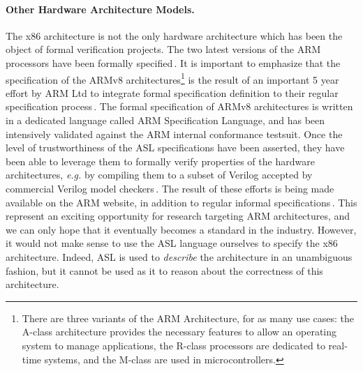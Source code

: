\paragraph{Other Hardware Architecture Models.}
%
The x86 architecture is not the only hardware architecture which has been the
object of formal verification projects.
%
The two latest versions of the ARM processors have been formally
specified\,\cite{fox2010armv7,reid2016armv8}.
%
It is important to emphasize that the specification of the ARMv8
architectures\footnote{There are three variants of the ARM Architecture, for as
  many use cases: the A-class architecture provides the necessary features to
  allow an operating system to manage applications, the R-class processors are
  dedicated to real-time systems, and the M-class are used in microcontrollers.}
is the result of an important 5 year effort by ARM Ltd to integrate formal
specification definition to their regular specification
process\,\cite{reid2016armv8}.
%
The formal specification of ARMv8 architectures is written in a dedicated
language called ARM Specification Language, and has been intensively validated
against the ARM internal conformance testsuit.
%
Once the level of trustworthiness of the ASL specifications have been asserted,
they have been able to leverage them to formally verify properties of the
hardware architectures, \emph{e.g.} by compiling them to a subset of Verilog
accepted by commercial Verilog model checkers\,\cite{reid2016end}.
%
The result of these efforts is being made available on the ARM website, in
addition to regular informal specifications\,\cite{arm2018aspec}.
%
This represent an exciting opportunity for research targeting ARM architectures,
and we can only hope that it eventually becomes a standard in the industry.
%
However, it would not make sense to use the ASL language ourselves to specify
the x86 architecture. 
%
Indeed, ASL is used to \emph{describe} the architecture in an unambiguous
fashion, but it cannot be used as it to reason about the correctness of this
architecture. 

